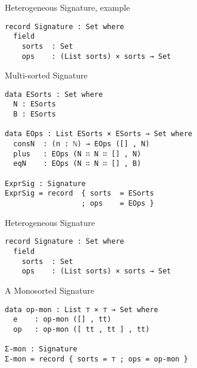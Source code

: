 \documentclass[11pt]{beamer}
\begin{document}
\begin{frame}[fragile]{Heterogeneous Signature, example}
  \begin{block}{}
    \begin{verbatim}
record Signature : Set where 
  field
    sorts  : Set
    ops    : (List sorts) × sorts → Set
    \end{verbatim}
  \end{block}
  \pause

  \begin{block}{Multi-sorted Signature}
    \begin{verbatim}
data ESorts : Set where
  N : ESorts
  B : ESorts
  
data EOps : List ESorts × ESorts → Set where
  consN  : (n : ℕ) → EOps ([] , N)
  plus   : EOps (N ∷ N ∷ [] , N)
  eqN    : EOps (N ∷ N ∷ [] , B)

ExprSig : Signature
ExprSig = record  { sorts  = ESorts
                  ; ops    = EOps }
    \end{verbatim}

  \end{block}
\end{frame}

\begin{frame}[fragile]{Heterogeneous Signature}
  \begin{block}{}
\begin{verbatim}
record Signature : Set where 
  field
    sorts  : Set
    ops    : (List sorts) × sorts → Set
    \end{verbatim}
  \end{block}


  \begin{block}{A Monosorted Signature}
    \begin{verbatim}
data op-mon : List ⊤ × ⊤ → Set where
  e    : op-mon ([] , tt)
  op   : op-mon ([ tt , tt ] , tt)

Σ-mon : Signature
Σ-mon = record { sorts = ⊤ ; ops = op-mon }
    \end{verbatim}

  \end{block}
\end{frame}
\end{document}
